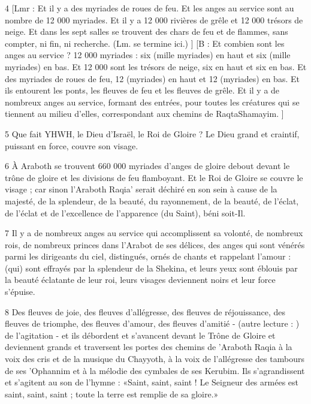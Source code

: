 \par 4 [Lmr : Et il y a des myriades de roues de feu. Et les anges au service sont au nombre de 12 000 myriades. Et il y a 12 000 rivières de grêle et 12 000 trésors de neige. Et dans les sept salles se trouvent des chars de feu et de flammes, sans compter, ni fin, ni recherche. (Lm. se termine ici.) ] [B : Et combien sont les anges au service ? 12 000 myriades : six (mille myriades) en haut et six (mille myriades) en bas. Et 12 000 sont les trésors de neige, six en haut et six en bas. Et des myriades de roues de feu, 12 (myriades) en haut et 12 (myriades) en bas. Et ils entourent les ponts, les fleuves de feu et les fleuves de grêle. Et il y a de nombreux anges au service, formant des entrées, pour toutes les créatures qui se tiennent au milieu d'elles, correspondant aux chemins de RaqtaShamayim. ]

\par 5 Que fait YHWH, le Dieu d'Israël, le Roi de Gloire ? Le Dieu grand et craintif, puissant en force, couvre son visage.

\par 6 À Araboth se trouvent 660 000 myriades d'anges de gloire debout devant le trône de gloire et les divisions de feu flamboyant. Et le Roi de Gloire se couvre le visage ; car sinon l'Araboth Raqia' serait déchiré en son sein à cause de la majesté, de la splendeur, de la beauté, du rayonnement, de la beauté, de l'éclat, de l'éclat et de l'excellence de l'apparence (du Saint), béni soit-Il.

\par 7 Il y a de nombreux anges au service qui accomplissent sa volonté, de nombreux rois, de nombreux princes dans l'Arabot de ses délices, des anges qui sont vénérés parmi les dirigeants du ciel, distingués, ornés de chants et rappelant l'amour : (qui) sont effrayés par la splendeur de la Shekina, et leurs yeux sont éblouis par la beauté éclatante de leur roi, leurs visages deviennent noirs et leur force s'épuise.

\par 8 Des fleuves de joie, des fleuves d'allégresse, des fleuves de réjouissance, des fleuves de triomphe, des fleuves d'amour, des fleuves d'amitié - (autre lecture : ) de l'agitation - et ils débordent et s'avancent devant le Trône de Gloire et deviennent grands et traversent les portes des chemins de 'Araboth Raqia à la voix des cris et de la musique du Chayyoth, à la voix de l'allégresse des tambours de ses 'Ophannim et à la mélodie des cymbales de ses Kerubim. Ils s'agrandissent et s'agitent au son de l'hymne : «Saint, saint, saint ! Le Seigneur des armées est saint, saint, saint ; toute la terre est remplie de sa gloire.»


